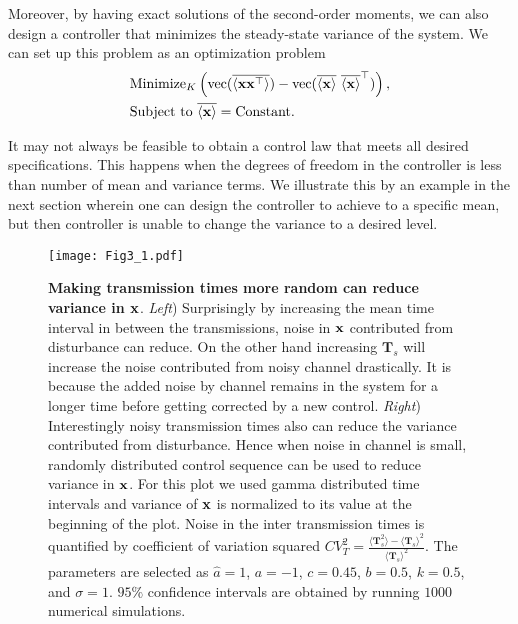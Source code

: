 \documentclass[letterpaper, 10 pt,one column, conference]{ieeeconf}  %
\begin{document}
Moreover, by having exact solutions of the second-order moments, we can also design a controller that minimizes the steady-state variance of the system. We can set up this problem as an optimization problem 
\begin{subequations}
	\begin{align}
	&\text{Minimize}_K \left({\rm vec}(\overline{\langle \bold x \bold x^\top \rangle}) - {\rm vec}(\overline{\langle \bold x \bold \rangle} \ \overline{\langle \bold x \bold \rangle}^\top ) \right),\\
	&\text{Subject to }  \overline{\langle \bold x \bold \rangle}= {\rm Constant} .
	\end{align}
\end{subequations}

It may not always be feasible to obtain a control law that meets all desired specifications. This happens when the degrees of freedom in the controller is less than number of mean and variance terms. We illustrate this by an example in the next section wherein one can design the controller to achieve to a specific mean, but then controller is unable to change the variance to a desired level.




\begin{figure}[!h]
	\centering
	{\texttt{[image: Fig3\_1.pdf]}}
	\caption{{\bf Making transmission times more random  can reduce variance in $\bold x$}.
\textit{Left}) Surprisingly by increasing the mean time interval in between the transmissions, noise in $\bold x$ contributed from disturbance can reduce. On the other hand increasing $\boldsymbol T_s$ will increase the noise contributed from noisy channel drastically. It is because the added noise by channel remains in the system for a longer time before getting corrected by a new control. \textit{Right})
Interestingly noisy transmission times also can reduce the variance contributed from disturbance. Hence when noise in channel is small, randomly distributed control sequence can be used to reduce variance in $\bold x$. For this plot we used gamma distributed time intervals and variance of $\bold x$ is normalized to its value at the beginning of the plot. Noise in the inter transmission times is quantified by coefficient of variation squared $CV^2_T =\frac{\langle \boldsymbol T_s^2 \rangle - \langle \boldsymbol T_s \rangle^2 }{\langle \boldsymbol T_s \rangle^2}$. 
  The  parameters are selected as $\hat{a}=1$,  $a = -1$, $c=0.45$, $b = 0.5$, $ k = 0.5$, and $\sigma=1$. $95\% $ confidence intervals are obtained by running $1000$ numerical simulations. 
}
\end{figure}
\end{document}
